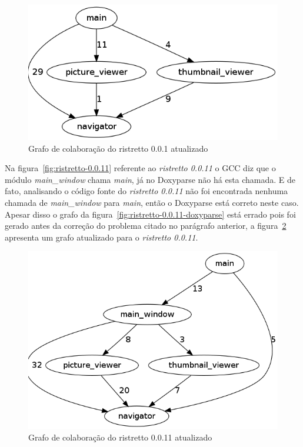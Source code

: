 \begin{figure}[h]
\center
\includegraphics[scale=0.4]{imagens/ristretto-0_0_1-doxyparse-2}
\caption{Grafo de colaboração do ristretto 0.0.1 atualizado}
\label{fig:ristretto-0.0.1-doxyparse-2}
\end{figure}

Na figura~\ref{fig:ristretto-0.0.11} referente ao {\it ristretto 0.0.11} o GCC
diz que o módulo {\it main\_window} chama {\it main}, já no Doxyparse não há
esta chamada. E de fato, analisando o código fonte do {\it ristretto 0.0.11}
não foi encontrada nenhuma chamada de {\it main\_window} para {\it main}, então
o Doxyparse está correto neste caso. Apesar disso o grafo da
figura~\ref{fig:ristretto-0.0.11-doxyparse} está errado pois foi gerado antes
da correção do problema citado no parágrafo anterior, a
figura~\ref{fig:ristretto-0.0.11-doxyparse-2} apresenta um grafo atualizado
para o {\it ristretto 0.0.11}.

\begin{figure}
\center
\includegraphics[scale=0.4]{imagens/ristretto-0_0_11-doxyparse-2}
\caption{Grafo de colaboração do ristretto 0.0.11 atualizado}
\label{fig:ristretto-0.0.11-doxyparse-2}
\end{figure}

